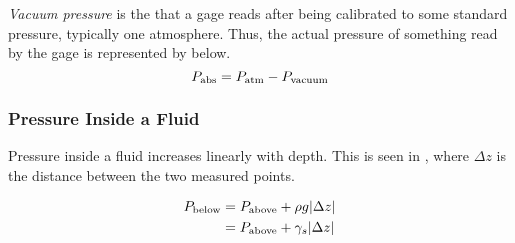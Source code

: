 \begin{definition}\label{def:Vacuum_Pressure}
  \emph{Vacuum pressure} is the  that a gage reads after being calibrated to some standard pressure, typically one atmosphere.
  Thus, the actual pressure of something read by the gage is represented by  below.
  \begin{equation}\label{eq:Vacuum_Pressure}
    P_{\mathrm{abs}} = P_{\mathrm{atm}} - P_{\mathrm{vacuum}}
  \end{equation}
\end{definition}

\subsubsection{Pressure Inside a Fluid}\label{subsubsec:Pressure_Inside_Fluid}
Pressure inside a fluid increases linearly with depth.
This is seen in , where $\Delta z$ is the distance between the two measured points.

\begin{equation}\label{eq:Pressure_in_Fluid}
  \begin{aligned}
    P_{\mathrm{below}} &= P_{\mathrm{above}} + \rho g \lvert \Delta z \rvert \\
    &= P_{\mathrm{above}} + \gamma_{s} \lvert \Delta z \rvert \\
  \end{aligned}
\end{equation}

